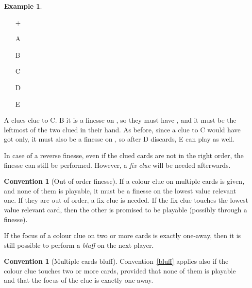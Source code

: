 \documentclass[a4paper]{article}
\theoremstyle{plain}
\theoremstyle{definition}
\newtheorem{example}[theorem]{Example}
\newtheorem{convention}[theorem]{Convention}
\begin{document}
\begin{example}	\hfill \\
	\begin{minipage}{0.45\textwidth}
		\begin{itemize}
			\item[\Large +]      
			\item[\Large A]    
			\item[\Large B]    
			\item[\Large C]    
			\item[\Large D]    
			\item[\Large E]    
		\end{itemize}
	\end{minipage}%
	\begin{minipage}{0.55\textwidth}
		A clues  clue to C. B it is a finesse on , so they must have , and it must be the leftmost of the two clued  in their hand. As before, since a  clue to C would have got  only, it must also be a finesse on , so after D discards, E can play as well.
	\end{minipage}
\end{example} \vspace{0.15 cm}

In case of a reverse finesse, even if the clued cards are not in the right order, the finesse can still be performed. However, a \emph{fix clue} will be needed afterwards.

\begin{convention}[Out of order finesse]
	If a colour clue on multiple cards is given, and none of them is playable, it must be a finesse on the lowest value relevant one. If they are out of order, a fix clue is needed. If the fix clue touches the lowest value relevant card, then the other is promised to be playable (possibly through a finesse).
\end{convention}

If the focus of a colour clue on two or more cards is exactly one-away, then it is still possible to perform a \emph{bluff} on the next player.

\begin{convention}[Multiple cards bluff]
	Convention~\ref{bluff} applies also if the colour clue touches two or more cards, provided that none of them is playable and that the focus of the clue is exactly one-away.
\end{convention}
\end{document}
